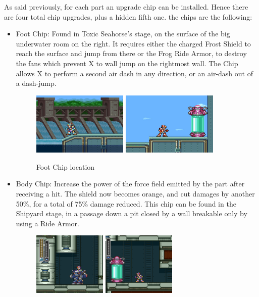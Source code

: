 As said previously, for each part an upgrade chip can be installed. Hence there are four total chip upgrades, plus a hidden fifth one. the chips are the following:
\begin{itemize}
	\item Foot Chip: Found in Toxic Seahorse's stage, on the surface of the big underwater room on the right. It requires either the charged Frost Shield to reach the surface and jump from there or the Frog Ride Armor, to destroy the fans which prevent X to wall jump on the rightmost wall. The Chip allows X to perform a second air dash in any direction, or an air-dash out of a dash-jump.
	\begin{figure}[htp]
		\centering
		\includegraphics[height=3cm]{figures/X3/Toxic_seahorse/Armor_1.png}
		\includegraphics[height=3cm]{figures/X3/Toxic_seahorse/Armor_2.png}
		\caption{Foot Chip location}
	\end{figure}
	\item Body Chip: Increase the power of the force field emitted by the part after receiving a hit. The shield now becomes orange, and cut damages by another 50\%, for a total of 75\% damage reduced. This chip can be found in the Shipyard stage, in a passage down a pit closed by a wall breakable only by using a Ride Armor.
	\begin{figure}[htp]
		\centering
		\includegraphics[height=3cm]{figures/X3/Crush_crawfish/Armor_1.png}
		\includegraphics[height=3cm]{figures/X3/Crush_crawfish/Armor_2.png}

\end{figure}
\end{itemize}
